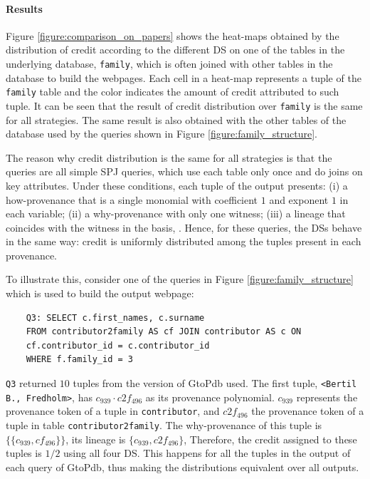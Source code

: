 \paragraph{Results} Figure \ref{figure:comparison_on_papers} shows the heat-maps obtained by the distribution of credit according to the  different DS on one of the tables in the underlying database, \texttt{family}, 
which is often joined with other tables in the database to build the webpages. Each cell in a heat-map represents a tuple of the \texttt{family} table and the color indicates the amount of credit attributed to such tuple.
It can be seen that the result of  credit distribution over \texttt{family} is the same for all  strategies. The same result is also obtained with the other tables of the database used by the queries shown in Figure \ref{figure:family_structure}. 

The reason why credit distribution is the same for all  strategies is that the queries are all simple SPJ queries, which use each table only once and do joins on key attributes. 
Under these conditions, each tuple of the output presents: (i) a how-provenance that is a single monomial with coefficient $1$ and exponent $1$ in each variable; (ii) a why-provenance with only one witness; (iii) a lineage that coincides with the witness in the basis, .
Hence, for these queries, the  DSs behave in the same way: credit is uniformly distributed among the tuples present in each provenance. 

To illustrate this, consider one of the queries in Figure \ref{figure:family_structure} which is used to build the output webpage:

\vspace{2mm}
{\footnotesize
\begin{adjustwidth}{25pt}{5pt}
	\begin{verbatim}
	Q3: SELECT c.first_names, c.surname
	FROM contributor2family AS cf JOIN contributor AS c ON 
	cf.contributor_id = c.contributor_id 
	WHERE f.family_id = 3
\end{verbatim}
\end{adjustwidth}
}
\vspace{2mm}

\texttt{Q3} returned $10$ tuples from the version of GtoPdb used. 
The first tuple, \texttt{<Bertil B., Fredholm>}, has  $c_{939} \cdot c2f_{496}$ as its provenance polynomial.
$c_{939}$ represents the provenance token of a tuple in \texttt{contributor}, and $c2f_{496}$ the provenance token of a tuple in table \texttt{contributor2family}. 
The why-provenance of this tuple is $\{\{c_{939}, cf_{496} \}\}$, its lineage is $\{c_{939}, c2f_{496} \}$, 
Therefore, the credit assigned to these tuples is $1/2$ using all four DS.
This happens for all the tuples in the output of each query of GtoPdb, thus making the distributions equivalent over all outputs.

